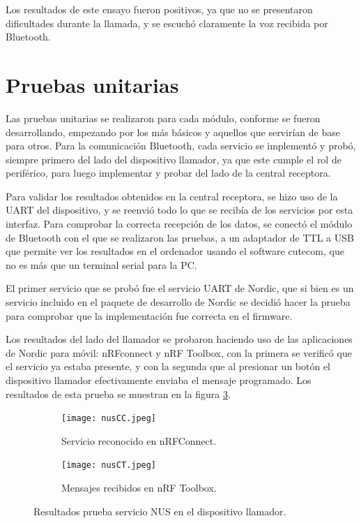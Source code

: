 Los resultados de este ensayo fueron positivos, ya que no se presentaron dificultades durante la llamada, y se escuchó claramente la voz recibida por Bluetooth.

\section{Pruebas unitarias}
\label{sec:pruebasUN}

Las pruebas unitarias se realizaron para cada módulo, conforme se fueron desarrollando, empezando por los más básicos y aquellos que servirían de base para otros. Para la comunicación Bluetooth, cada servicio se implementó y probó, siempre primero del lado del dispositivo llamador, ya que este cumple el rol de periférico, para luego implementar y probar del lado de la central receptora.

Para validar los resultados obtenidos en la central receptora, se hizo uso de la UART del dispositivo, y se reenvió todo lo que se recibía de los servicios por esta interfaz. Para comprobar la correcta recepción de los datos, se conectó el módulo de Bluetooth con el que se realizaron las pruebas, a un adaptador de TTL a USB que permite ver los resultados en el ordenador usando el software cutecom, que no es más que un terminal serial para la PC.

El primer servicio que se probó fue el servicio UART de Nordic, que si bien es un servicio incluido en el paquete de desarrollo de Nordic se decidió hacer la prueba para comprobar que la implementación fue correcta en el firmware. 

Los resultados del lado del llamador se probaron haciendo uso de las aplicaciones de Nordic para móvil: nRFconnect y nRF Toolbox, con la primera se verificó que el servicio ya estaba presente, y con la segunda que al presionar un botón el dispositivo llamador efectivamente enviaba el mensaje programado. Los resultados de esta prueba se muestran en la figura \ref{fig:Pnus}.

\begin{figure}[htpb]
	\centering
   	\begin{subfigure}[b]{0.5\textwidth}
   		\centering
      	\texttt{[image: nusCC.jpeg]}
      	\caption{Servicio reconocido en nRFConnect.}
      	\label{fig:PnusA}
   	\end{subfigure}%
   	\begin{subfigure}[b]{0.5\textwidth}
   		\centering
      	\texttt{[image: nusCT.jpeg]}
      	\caption{Mensajes recibidos en nRF Toolbox.}
      	\label{fig:PnusB}
   	\end{subfigure}%
	\caption{Resultados prueba servicio NUS en el dispositivo llamador.}
	\label{fig:Pnus}
\end{figure}

